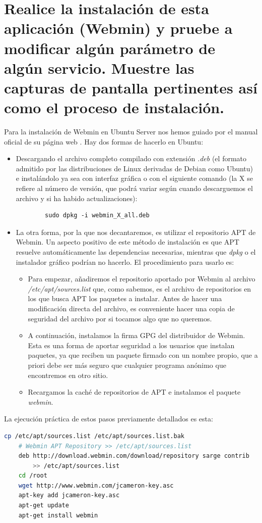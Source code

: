 \section{Realice la instalación de esta aplicación (Webmin) y pruebe a modificar algún parámetro de algún servicio. Muestre las capturas de pantalla pertinentes así como el proceso de instalación.}
Para la instalación de Webmin en Ubuntu Server nos hemos guiado por el manual oficial de su página web \cite{webmin-deb}. Hay dos formas de hacerlo en Ubuntu:
\begin{itemize}
	\item Descargando el archivo completo compilado con extensión \emph{.deb} (el formato admitido por las distribuciones de Linux derivadas de Debian como Ubuntu) e instalándolo ya sea con interfaz gráfica o con el siguiente comando (la X se refiere al número de versión, que podrá variar según cuando descarguemos el archivo y si ha habido actualizaciones):
	\begin{verbatim}
		sudo dpkg -i webmin_X_all.deb
	\end{verbatim}
	\item La otra forma, por la que nos decantaremos, es utilizar el repositorio APT de Webmin. Un aspecto positivo de este método de instalación es que APT resuelve automáticamente las dependencias necesarias, mientras que \emph{dpkg} o el instalador gráfico podrían no hacerlo. El procedimiento para usarlo es:
	\begin{itemize}
		\item Para empezar, añadiremos el repositorio aportado por Webmin al archivo \emph{/etc/apt/sources.list} que, como sabemos, es el archivo de repositorios en los que busca APT los paquetes a instalar. Antes de hacer una modificación directa del archivo, es conveniente hacer una copia de seguridad del archivo por si tocamos algo que no queremos.
		\item A continuación, instalamos la firma GPG del distribuidor de Webmin. Esta es una forma de aportar seguridad a los usuarios que instalan paquetes, ya que reciben un paquete firmado con un nombre propio, que a priori debe ser más seguro que cualquier programa anónimo que encontremos en otro sitio.
		\item Recargamos la caché de repositorios de APT e instalamos el paquete \emph{webmin}.
	\end{itemize}
\end{itemize}
La ejecución práctica de estos pasos previamente detallados es esta:
\begin{lstlisting}[language=bash]
	cp /etc/apt/sources.list /etc/apt/sources.list.bak
	# Webmin APT Repository >> /etc/apt/sources.list
	deb http://download.webmin.com/download/repository sarge contrib 
	    >> /etc/apt/sources.list
	cd /root
	wget http://www.webmin.com/jcameron-key.asc
	apt-key add jcameron-key.asc
	apt-get update
	apt-get install webmin
\end{lstlisting}
